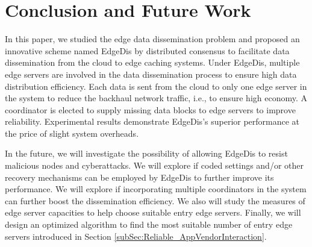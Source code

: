 \documentclass[10pt,journal,compsoc]{IEEEtran}
\begin{document}

\vspace{-1em}
\section{Conclusion and Future Work}
\label{Sec:Conclusion}

In this paper, we studied the edge data dissemination problem and proposed an innovative scheme named EdgeDis by distributed consensus to facilitate data dissemination from the cloud to edge caching systems. Under EdgeDis, multiple edge servers are involved in the data dissemination process to ensure high data distribution efficiency. Each data is sent from the cloud to only one edge server in the system to reduce the backhaul network traffic, i.e., to ensure high economy. A coordinator is elected to supply missing data blocks to edge servers to improve reliability. Experimental results demonstrate EdgeDis's superior performance at the price of slight system overheads. 

In the future, we will investigate the possibility of allowing EdgeDis to resist malicious nodes and cyberattacks. We will explore if coded settings and/or other recovery mechanisms can be employed by EdgeDis to further improve its performance. We will explore if incorporating multiple coordinators in the system can further boost the dissemination efficiency. We also will study the measures of edge server capacities to help choose suitable entry edge servers. Finally, we will design an optimized algorithm to find the most suitable number of entry edge servers introduced in Section \ref{subSec:Reliable_AppVendorInteraction}.
\end{document}
